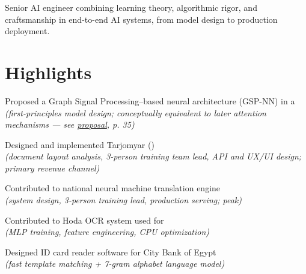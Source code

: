\documentclass[letterpaper, hidelinks, 11pt]{article}
\begin{document}
\vspace{-0.9em}
{Senior AI engineer combining learning theory, algorithmic rigor, and craftsmanship in end-to-end AI systems, from model design to production deployment.}
\section{Highlights}
\begin{resume_list}
  \item Proposed a Graph Signal Processing–based neural architecture (GSP-NN) in a
  \\ \hfill \textit{(first-principles model design;
    conceptually equivalent to later attention mechanisms — see
    \href{https://github.com/vedadian/phd_proposal_2015/}{proposal}, p. 35)}
  \vskip3mm
  \item Designed and implemented Tarjomyar ()\\ \hfill \textit{(document layout analysis, 3-person training
    team lead, API and UX/UI design; primary revenue channel)} \vskip3mm
  \item Contributed to national neural machine translation engine\\
  \hfill\textit{(system design, 3-person training lead, production serving;
     peak)} \vskip3mm
  \item Contributed to Hoda OCR system used for \\
  \hfill \textit{(MLP training, feature engineering, CPU optimization)}
  \item Designed ID card reader software for City Bank of Egypt\\ \hfill \textit{(fast
    template matching + 7-gram alphabet language model)}
\end{resume_list}
\end{document}
